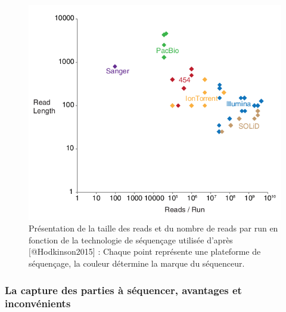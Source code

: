 \documentclass[12pt,twoside]{ugathesis}
\theoremstyle{definition}
\theoremstyle{definition}
\theoremstyle{remark}
\begin{document}
\begin{figure}

{\centering \includegraphics[scale=.55]{figure/read_per_run} 

}

\caption[Présentation de la taille des reads et du nombre de reads par run en fonction de la technologie de séquençage utilisée]{Présentation de la taille des reads et du nombre de reads par run en fonction de la technologie de séquençage utilisée d'après [@Hodkinson2015] : Chaque point représente une plateforme de séquençage, la couleur détermine la marque du séquenceur.}\label{fig:readPerRun}
\end{figure}

\subsubsection{La capture des parties à séquencer, avantages et
inconvénients}\label{la-capture-des-parties-a-sequencer-avantages-et-inconvenients}
\end{document}

